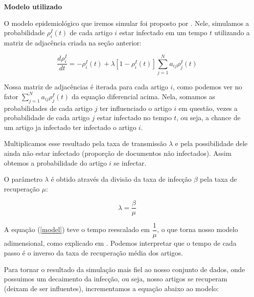 \documentclass[a4paper,12pt]{article}
\begin{document}
 \begin{description}
  \item \textbf{Modelo utilizado}
  
    
    O modelo epidemiológico que iremos simular foi proposto por \citet[p. 940, eq. (33)]{pastor2014epidemic}. Nele,
    simulamos a probabilidade $\rho^{I}_{i}(t)$ de cada artigo $i$ estar infectado em um tempo $t$ utilizando a matriz de adjacência criada na seção anterior:

    \begin{equation}
      \dfrac{d\rho^{I}_{i}}{dt} = -\rho^{I}_{i}(t) + \lambda[1- \rho_{i}^{I}(t)] \sum_{j=1}^{N} a_{ij}\rho_{j}^{I}(t)
      \label{model}
    \end{equation}

    Nossa matriz de adjacências é iterada para cada artigo $i$, como podemos ver no fator $\sum_{j=1}^{N} a_{ij}\rho_{j}^{I}(t)$ da 
    equação diferencial acima. Nela, somamos as probabilidades de cada artigo $j$ ter influenciado o artigo $i$ em questão, vezes a probabilidade
    de cada artigo $j$ estar infectado no tempo $t$, ou seja, a chance de um artigo ja infectado ter infectado o artigo $i$.
    
    Multiplicamos esse resultado pela taxa de transmissão $\lambda$ e pela possibilidade dele ainda não estar infectado (proporção
    de documentos não infectados). Assim obtemos a probabilidade do artigo $i$ se infectar. 
    
    O parâmetro $\lambda$ é obtido através da divisão da taxa de infecção $\beta$ pela taxa de recuperação $\mu$:
    
    \begin{equation}
     \lambda = \dfrac{\beta}{\mu}
    \end{equation}
    
    A equação (\ref{model}) teve o tempo reescalado em $\dfrac{1}{\mu}$, o que torna nosso modelo adimensional,
    como explicado em \citet[p. 939]{pastor2014epidemic}. Podemos interpretar que o tempo de cada passo é o inverso da taxa de 
    recuperação  média dos artigos. 
   
    Para tornar o resultado da simulação mais fiel ao nosso conjunto de dados, onde possuimos um decaimento da infecção, ou seja,
    nosso artigos se recuperam (deixam de ser influentes), incrementamos a equação abaixo ao modelo:
    

\end{description}
\end{document}
